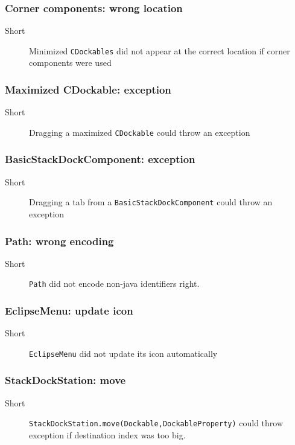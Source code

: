 \documentclass[a4paper,10pt]{article}
\newcommand{\src}[1]{\lstinline[basicstyle=\normalsize\ttfamily,keywordstyle=\normalsize\ttfamily,identifierstyle=\normalsize\ttfamily]|#1|}
\newcommand{\short}{\item[Short]}
\begin{document}
\subsubsection{Corner components: wrong location}
\begin{description}
 \short Minimized \src{CDockables} did not appear at the correct location if corner components were used
\end{description}

\subsubsection{Maximized CDockable: exception}
\begin{description}
 \short Dragging a maximized \src{CDockable} could throw an exception
\end{description}


\subsubsection{BasicStackDockComponent: exception}
\begin{description}
 \short Dragging a tab from a \src{BasicStackDockComponent} could throw an exception
\end{description}

\subsubsection{Path: wrong encoding}
\begin{description}
 \short \src{Path} did not encode non-java identifiers right.
\end{description}

\subsubsection{EclipseMenu: update icon}
\begin{description}
 \short \src{EclipseMenu} did not update its icon automatically
\end{description}

\subsubsection{StackDockStation: move}
\begin{description}
 \short \src{StackDockStation.move(Dockable,DockableProperty)} could throw exception if destination index was too big.
\end{description}
\end{document}
